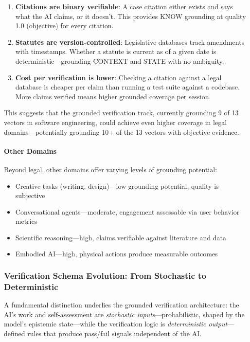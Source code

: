 \begin{enumerate}
    \item \textbf{Citations are binary verifiable}: A case citation either exists and says what the AI claims, or it doesn't. This provides KNOW grounding at quality 1.0 (objective) for every citation.
    \item \textbf{Statutes are version-controlled}: Legislative databases track amendments with timestamps. Whether a statute is current as of a given date is deterministic---grounding CONTEXT and STATE with no ambiguity.
    \item \textbf{Cost per verification is lower}: Checking a citation against a legal database is cheaper per claim than running a test suite against a codebase. More claims verified means higher grounded coverage per session.
\end{enumerate}

This suggests that the grounded verification track, currently grounding 9 of 13 vectors in software engineering, could achieve even higher coverage in legal domains---potentially grounding 10+ of the 13 vectors with objective evidence.

\paragraph{Other Domains}

Beyond legal, other domains offer varying levels of grounding potential:

\begin{itemize}
    \item Creative tasks (writing, design)---low grounding potential, quality is subjective
    \item Conversational agents---moderate, engagement assessable via user behavior metrics
    \item Scientific reasoning---high, claims verifiable against literature and data
    \item Embodied AI---high, physical actions produce measurable outcomes
\end{itemize}

\subsubsection{Verification Schema Evolution: From Stochastic to Deterministic}

A fundamental distinction underlies the grounded verification architecture: the AI's work and self-assessment are \emph{stochastic inputs}---probabilistic, shaped by the model's epistemic state---while the verification logic is \emph{deterministic output}---defined rules that produce pass/fail signals independent of the AI.

